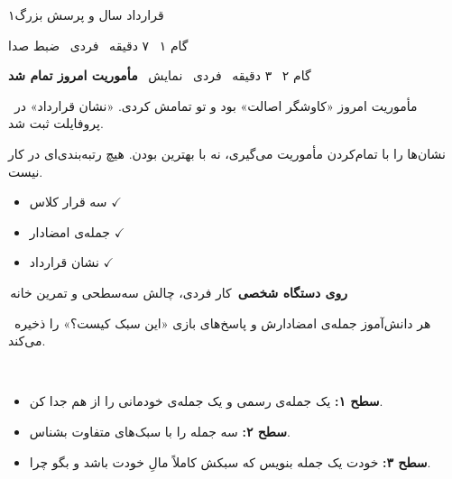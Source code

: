 \documentclass[11pt,a4paper]{article}
\newcommand{\en}[1]{\lr{#1}}
\newcommand{\dastehead}[3]{%
  \smallskip\noindent
  \colorbox{#3!12}{\textcolor{#3}{\textbf{\,#1\,}}}\hspace{0.5em}%
  \textcolor{#3}{\small #2}\par\nopagebreak\vspace{3pt}}
\newcommand{\lbl}[2]{\noindent{\small\textbf{\textcolor{#1}{#2}}}\ }
\begin{document}
\begin{jalasebox}{۱}{قرارداد سال و پرسش بزرگ}
\begin{stepbox}{گام ۱ \textbar\ ۷ دقیقه \textbar\ فردی \textbar\ ضبط صدا}
\par
{}\par
\vspace{5pt}
\end{stepbox}
\begin{stepbox}{گام ۲ \textbar\ ۳ دقیقه \textbar\ فردی \textbar\ نمایش}
\lbl{stepcol}{\en{G6-S01-E2}}\textbf{مأموریت امروز تمام شد}\par
\noindent{\small\textcolor{tchcol}{صفحه:}}\ مأموریت امروز «کاوشگر اصالت» بود و تو تمامش کردی. «نشان قرارداد» در پروفایلت ثبت شد.\par\noindent \par\noindent نشان‌ها را با تمام‌کردن مأموریت می‌گیری، نه با بهترین بودن. هیچ رتبه‌بندی‌ای در کار نیست.\par
\begin{itemize}
\item سه قرار کلاس \ensuremath{\checkmark}
\item جمله‌ی امضادار \ensuremath{\checkmark}
\item نشان قرارداد \ensuremath{\checkmark}
\end{itemize}
\par
{}\par
\vspace{5pt}
\end{stepbox}
\dastehead{روی دستگاه شخصی}{کار فردی، چالش سه‌سطحی و تمرین خانه}{mescol}
\lbl{mescol}{کار:}هر دانش‌آموز جمله‌ی امضادارش و پاسخ‌های بازی «این سبک کیست؟» را ذخیره می‌کند.\par
\lbl{mescol}{چالش سه‌سطحی:}\par
\begin{itemize}
\item \textbf{سطح ۱:} یک جمله‌ی رسمی و یک جمله‌ی خودمانی را از هم جدا کن.
\item \textbf{سطح ۲:} سه جمله را با سبک‌های متفاوت بشناس.
\item \textbf{سطح ۳:} خودت یک جمله بنویس که سبکش کاملاً مالِ خودت باشد و بگو چرا.

\end{itemize}
\end{jalasebox}
\end{document}
